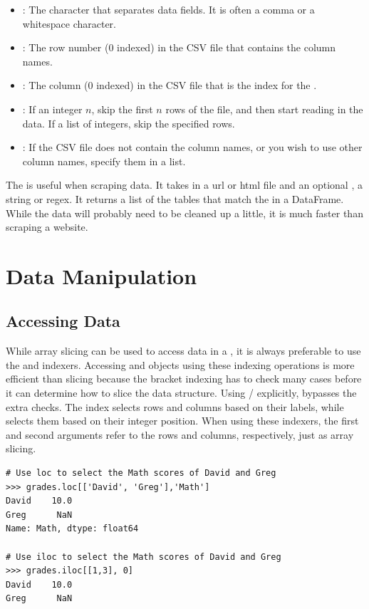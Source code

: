 \begin{itemize}
\item {}:
The character that separates data fields. It is often a
comma or a whitespace character.
\item {}: The row number (0 indexed) in the CSV file that contains the column names.
 \item {}: The column (0 indexed) in the CSV file that is the index for the
.
 \item {}:
If an integer $n$, skip the first $n$ rows of the file, and then start reading
in the data.
If a list of integers, skip the specified rows.
 \item {}:
If the CSV file does not contain the column names, or you wish to use other
column names, specify them in a list.
\end{itemize}

The  is useful when scraping data.
It takes in a url or html file and an optional , a string or regex.
It returns a list of the tables that match the  in a DataFrame.
While the data will probably need to be cleaned up a little, it is much faster than scraping a website.

\section*{Data Manipulation}

\subsection*{Accessing Data}

While array slicing can be used to access data in a , it is always preferable to use the  and  indexers.
Accessing  and  objects
using these indexing operations is more efficient than slicing because the bracket indexing has to check many cases before it can determine how to slice the data structure.
Using / explicitly, bypasses the extra checks.
The  index selects rows and columns based on
their labels, while  selects them based on their
integer position.
When using these indexers, the first and second arguments refer to the rows and columns, respectively, just as array slicing.

\begin{lstlisting}
# Use loc to select the Math scores of David and Greg
>>> grades.loc[['David', 'Greg'],'Math']
David    10.0
Greg      NaN
Name: Math, dtype: float64

# Use iloc to select the Math scores of David and Greg
>>> grades.iloc[[1,3], 0]
David    10.0
Greg      NaN
\end{lstlisting}

